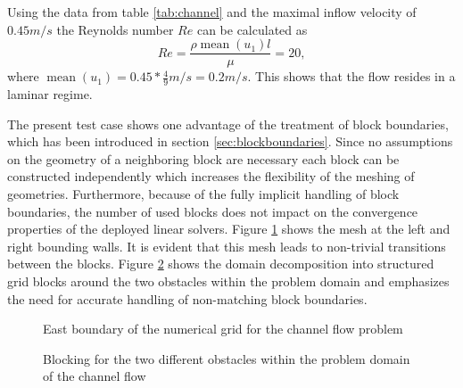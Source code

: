 Using the data from table \ref{tab:channel} and the maximal inflow velocity of $0.45m/s$ the Reynolds number \(Re\) can be calculated as
\begin{displaymath}
  Re = \frac{\rho \operatorname{mean}(u_1) l}{\mu} = 20,
\end{displaymath}
where \(\operatorname{mean}(u_1) = 0.45*\frac{4}{9} m/s = 0.2 m/s\). This shows that the flow resides in a laminar regime.

The present test case shows one advantage of the treatment of block boundaries, which has been introduced in section \ref{sec:blockboundaries}. Since no assumptions on the geometry of a neighboring block are necessary each block can be constructed independently which increases the flexibility of the meshing of geometries. Furthermore, because of the fully implicit handling of block boundaries, the number of used blocks does not impact on the convergence properties of the deployed linear solvers. Figure \ref{fig:channel1} shows the mesh at the left and right bounding walls. It is evident that this mesh leads to non-trivial transitions between the blocks. Figure \ref{fig:blocking} shows the domain decomposition into structured grid blocks around the two obstacles within the problem domain and emphasizes the need for accurate handling of non-matching block boundaries.

\begin{figure}
  \centering
  
  \caption{East boundary of the numerical grid for the channel flow problem}
  \label{fig:channel1}
\end{figure}

%  

\begin{figure}
   \label{fig:cellvertex}
   \centering
    \hfil
    \caption{Blocking for the two different obstacles within the problem domain of the channel flow}
    \label{fig:blocking}
\end{figure}

